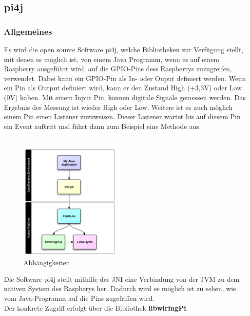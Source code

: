 \subsection{pi4j} \label{subsec:pi4j}
\subsubsection{Allgemeines}
Es wird die open source Software \ac{pi4j}, welche Bibliotheken zur Verfügung stellt, mit denen es möglich ist, von einem Java Programm, wenn es auf einem Raspberry ausgeführt wird, auf die \ac{GPIO}-Pins dess Raspberrys zuzugreifen, verwendet. Dabei kann ein \ac{GPIO}-Pin als In- oder Ouput definiert werden. Wenn ein Pin als Output definiert wird, kann er den Zustand High (+3,3V) oder Low (0V) haben. Mit einem Input Pin, können digitale Signale gemessen werden. Das Ergebnis der Messung ist wieder High oder Low. Weiters ist es auch möglich einem Pin einen Listener zuzuweisen. Dieser Listener wartet bis auf diesem Pin ein Event auftritt und führt dann zum Beispiel eine Methode aus. 
\\ \\

\begin{figure}
\vspace{-35pt}
  \begin{center}
    \includegraphics[width=0.45\textwidth]{Bilder/pi4j/dependencies}
  \end{center}
  \caption[Abhängigkeiten]{Abhängigkeiten\protect\footnotemark}
  \label{Abhaengigkeiten}
  \vspace{-160pt}
\end{figure}


Die Software \ac{pi4j} stellt mithilfe des \ac{JNI} eine Verbindung von der \ac{JVM} zu dem nativen System des Raspberys her. Dadurch wird es möglich ist zu sehen, wie vom Java-Programm auf die Pins zugefriffen wird.
\\ Der konkrete Zugriff erfolgt über die Bibliothek \textbf{libwiringPi}.



